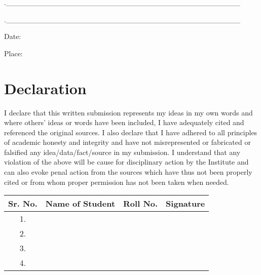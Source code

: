 \documentclass[11pt,a4paper]{report}
\begin{document}
.\_\_\_\_\_\_\_\_\_\_\_\_\_\_\_\_\_\_\_\_\_\_\_\_\_\_\_\_\_\_\_\_\_\_\_\_\_\_\_\_\_\_\_\_

\vspace{0.5cm}

.\_\_\_\_\_\_\_\_\_\_\_\_\_\_\_\_\_\_\_\_\_\_\_\_\_\_\_\_\_\_\_\_\_\_\_\_\_\_\_\_\_\_\_\_

\vspace{1cm}

\noindent Date:

\noindent Place:

\newpage

\chapter*{Declaration}
\thispagestyle{empty}

\vspace{1cm}

I declare that this written submission represents my ideas in my own words and where others' ideas or words have been included, I have adequately cited and referenced the original sources. I also declare that I have adhered to all principles of academic honesty and integrity and have not misrepresented or fabricated or falsified any idea/data/fact/source in my submission. I understand that any violation of the above will be cause for disciplinary action by the Institute and can also evoke penal action from the sources which have thus not been properly cited or from whom proper permission has not been taken when needed.

\vspace{1cm}

\begin{table}[h]
\centering
\begin{tabular}{|c|l|c|c|}
\hline
\textbf{Sr. No.} & \textbf{Name of Student} & \textbf{Roll No.} & \textbf{Signature} \\
\hline
1. & & & \\
\hline
2. & & & \\
\hline
3. & & & \\
\hline
4. & & & \\
\hline
\end{tabular}
\end{table}

\vspace{1cm}
\end{document}

